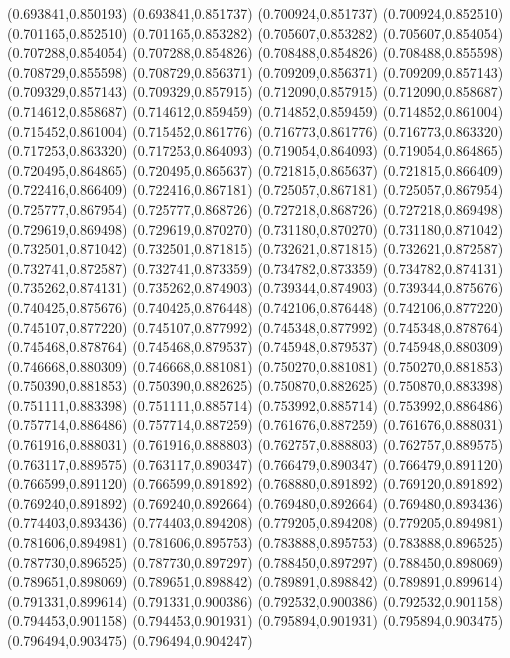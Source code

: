 (0.693841,0.850193)
(0.693841,0.851737)
(0.700924,0.851737)
(0.700924,0.852510)
(0.701165,0.852510)
(0.701165,0.853282)
(0.705607,0.853282)
(0.705607,0.854054)
(0.707288,0.854054)
(0.707288,0.854826)
(0.708488,0.854826)
(0.708488,0.855598)
(0.708729,0.855598)
(0.708729,0.856371)
(0.709209,0.856371)
(0.709209,0.857143)
(0.709329,0.857143)
(0.709329,0.857915)
(0.712090,0.857915)
(0.712090,0.858687)
(0.714612,0.858687)
(0.714612,0.859459)
(0.714852,0.859459)
(0.714852,0.861004)
(0.715452,0.861004)
(0.715452,0.861776)
(0.716773,0.861776)
(0.716773,0.863320)
(0.717253,0.863320)
(0.717253,0.864093)
(0.719054,0.864093)
(0.719054,0.864865)
(0.720495,0.864865)
(0.720495,0.865637)
(0.721815,0.865637)
(0.721815,0.866409)
(0.722416,0.866409)
(0.722416,0.867181)
(0.725057,0.867181)
(0.725057,0.867954)
(0.725777,0.867954)
(0.725777,0.868726)
(0.727218,0.868726)
(0.727218,0.869498)
(0.729619,0.869498)
(0.729619,0.870270)
(0.731180,0.870270)
(0.731180,0.871042)
(0.732501,0.871042)
(0.732501,0.871815)
(0.732621,0.871815)
(0.732621,0.872587)
(0.732741,0.872587)
(0.732741,0.873359)
(0.734782,0.873359)
(0.734782,0.874131)
(0.735262,0.874131)
(0.735262,0.874903)
(0.739344,0.874903)
(0.739344,0.875676)
(0.740425,0.875676)
(0.740425,0.876448)
(0.742106,0.876448)
(0.742106,0.877220)
(0.745107,0.877220)
(0.745107,0.877992)
(0.745348,0.877992)
(0.745348,0.878764)
(0.745468,0.878764)
(0.745468,0.879537)
(0.745948,0.879537)
(0.745948,0.880309)
(0.746668,0.880309)
(0.746668,0.881081)
(0.750270,0.881081)
(0.750270,0.881853)
(0.750390,0.881853)
(0.750390,0.882625)
(0.750870,0.882625)
(0.750870,0.883398)
(0.751111,0.883398)
(0.751111,0.885714)
(0.753992,0.885714)
(0.753992,0.886486)
(0.757714,0.886486)
(0.757714,0.887259)
(0.761676,0.887259)
(0.761676,0.888031)
(0.761916,0.888031)
(0.761916,0.888803)
(0.762757,0.888803)
(0.762757,0.889575)
(0.763117,0.889575)
(0.763117,0.890347)
(0.766479,0.890347)
(0.766479,0.891120)
(0.766599,0.891120)
(0.766599,0.891892)
(0.768880,0.891892)
(0.769120,0.891892)
(0.769240,0.891892)
(0.769240,0.892664)
(0.769480,0.892664)
(0.769480,0.893436)
(0.774403,0.893436)
(0.774403,0.894208)
(0.779205,0.894208)
(0.779205,0.894981)
(0.781606,0.894981)
(0.781606,0.895753)
(0.783888,0.895753)
(0.783888,0.896525)
(0.787730,0.896525)
(0.787730,0.897297)
(0.788450,0.897297)
(0.788450,0.898069)
(0.789651,0.898069)
(0.789651,0.898842)
(0.789891,0.898842)
(0.789891,0.899614)
(0.791331,0.899614)
(0.791331,0.900386)
(0.792532,0.900386)
(0.792532,0.901158)
(0.794453,0.901158)
(0.794453,0.901931)
(0.795894,0.901931)
(0.795894,0.903475)
(0.796494,0.903475)
(0.796494,0.904247)
